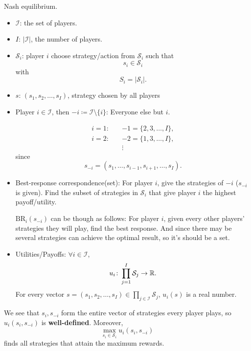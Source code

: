 \begin{prev}
	Nash equilibrium.
	\begin{itemize}
		\item \(\mathcal{I} \): the set of players.
		\item \(I\): \(\left\vert \mathcal{I}  \right\vert \), the number of players.
		\item \(\mathcal{S}_{i}\): player \(i\) choose strategy/action from \(\mathcal{S}_{i}\) such that
		      \[
			      s_{i}\in \mathcal{S}_i
		      \]
		      with
		      \[
			      S_{i} = \left\vert \mathcal{S}_i \right\vert.
		      \]
		\item \(s\): \((s_1, s_2, \ldots , s_I)\), strategy chosen by all players
		\item Player \(i\in \mathcal{I}\), then \(-i\coloneqq \mathcal{I}\setminus\{i\}\): Everyone else but \(i\).
		      \begin{eg}
			      \[
				      \begin{split}
					      i = 1\colon\quad& -1 = \{2, 3, \ldots , I\},\\
					      i = 2\colon\quad& -2 = \{1, 3, \ldots , I\},\\
					      &\vdots
				      \end{split}
			      \]
			      since
			      \[
				      s_{-i} = (s_1, \ldots , s_{i - 1}, s_{i + 1}, \ldots , s_{I}).
			      \]
		      \end{eg}
		\item Best-response correspondence(set): For player \(i\), give the strategies of \(-i\) (\(s_{-i} \) is given). Find the
		      subset of strategies in \(\mathcal{S}_i \) that give player \(i\) the highest payoff/utility.
		      \begin{intuition}
			      \(\mathrm{BR}_i(s_{-i})\) can be though as follows: For player \(i\), given every other players' strategies they will play, find the best response. And since there may be
			      several strategies can achieve the optimal result, so it's should be a set.
		      \end{intuition}
		\item Utilities/Payoffs: \(\forall i\in \mathcal{I} \),
		      \[
			      u_{i}\colon \prod\limits_{j = 1}^{I} \mathcal{S}_{j}\to \mathbb{\MakeUppercase{R}}.
		      \]
		      For every vector \(s = (s_1, s_2, \ldots , s_I)\in \prod\limits_{j\in \mathcal{I}} \mathcal{S}_j\), \(u_{i}(s)\)
		      is a real number.
	\end{itemize}
	\begin{remark}
		We see that \(s_{i}, s_{-i}\) form the entire vector of strategies every player plays, so \(u_{i}(s_{i}, s_{-i})\) is \textbf{well-defined}.
		Moreover,
		\[
			\max_{s_{i}\in\mathcal{S}_i}u_{i}(s_{i}, s_{-i})
		\]
		finds all strategies that attain the maximum rewards.
	\end{remark}
\end{prev}

